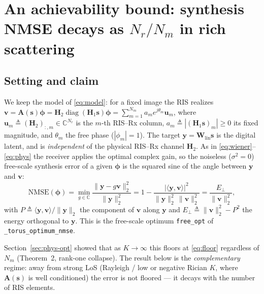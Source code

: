
\section{An achievability bound: synthesis NMSE decays as $N_r/N_m$ in rich scattering}
\label{sec:nm-bound}

\subsection{Setting and claim}

We keep the model of \eqref{eq:model}: for a fixed image the RIS realizes
$\mathbf{v}=\mathbf{A}(\mathbf{s})\boldsymbol{\phi}=\mathbf{H}_2\operatorname{diag}(\mathbf{H}_1\mathbf{s})\boldsymbol{\phi}
=\sum_{m=1}^{N_m} a_m e^{j\theta_m}\mathbf{u}_m$,
where $\mathbf{u}_m\triangleq(\mathbf{H}_2)_{:,m}\in\mathbb{C}^{N_r}$ is the $m$-th RIS--Rx column,
$a_m\triangleq|(\mathbf{H}_1\mathbf{s})_m|\ge0$ its fixed magnitude, and $\theta_m$ the free phase
($|\phi_m|=1$). The target $\mathbf{y}=\mathbf{W}_{\mathrm{lin}}\mathbf{s}$ is the digital latent, and is
\emph{independent} of the physical RIS--Rx channel $\mathbf{H}_2$. As in
\eqref{eq:wiener}--\eqref{eq:phys} the receiver applies the optimal complex gain, so the noiseless
($\sigma^2=0$) free-scale synthesis error of a given $\boldsymbol{\phi}$ is the squared sine of the
angle between $\mathbf{y}$ and $\mathbf{v}$:
\begin{equation}
  \mathrm{NMSE}(\boldsymbol{\phi})
  =\min_{g\in\mathbb{C}}\frac{\|\mathbf{y}-g\mathbf{v}\|_2^2}{\|\mathbf{y}\|_2^2}
  =1-\frac{|\langle\mathbf{y},\mathbf{v}\rangle|^2}{\|\mathbf{y}\|_2^2\,\|\mathbf{v}\|_2^2}
  =\frac{E_\perp}{\|\mathbf{v}\|_2^2},
  \label{eq:nmse-angle}
\end{equation}
with $P\triangleq\langle\mathbf{y},\mathbf{v}\rangle/\|\mathbf{y}\|_2$ the component of $\mathbf{v}$ along
$\mathbf{y}$ and $E_\perp\triangleq\|\mathbf{v}\|_2^2-P^2$ the energy orthogonal to $\mathbf{y}$. This is
the free-scale optimum \texttt{free\_opt} of \texttt{\_torus\_optimum\_nmse}.

Section~\ref{sec:phys-opt} showed that as $K\to\infty$ this floors at
\eqref{eq:floor} regardless of $N_m$ (Theorem~2, rank-one collapse). The
result below is the \emph{complementary} regime: away from strong LoS
(Rayleigh / low or negative Rician $K$, where $\mathbf{A}(\mathbf{s})$ is well conditioned)
the error is not floored --- it decays with the number of RIS elements.

